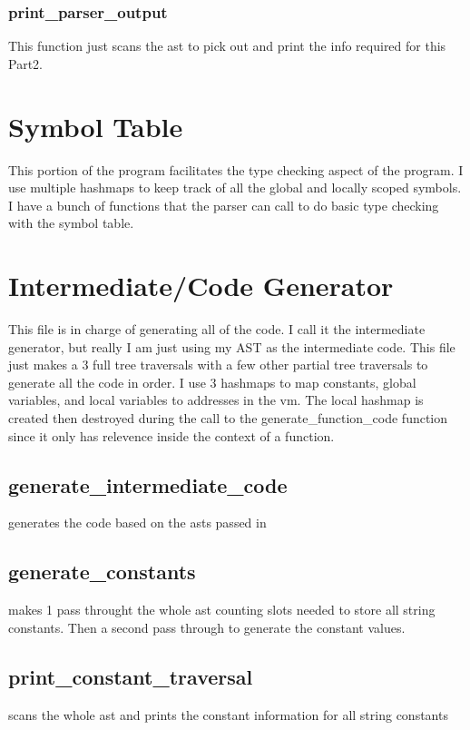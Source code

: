 \documentclass[11pt]{article}
\begin{document}
            \subsubsection{print\_parser\_output}
                This function just scans the ast to pick out and print the info required for this Part2.

    \section{Symbol Table}

        This portion of the program facilitates the type checking aspect of the program.
        I use multiple hashmaps to keep track of all the global and locally scoped symbols.
        I have a bunch of functions that the parser can call to do basic type checking with the
        symbol table.

    \section{Intermediate/Code Generator}
        This file is in charge of generating all of the code. I call it the intermediate generator,
        but really I am just using my AST as the intermediate code. This file just makes a 3 full
        tree traversals with a few other partial tree traversals to generate all the code in order.
        I use 3 hashmaps to map constants, global variables, and local variables to addresses in 
        the vm. The local hashmap is created then destroyed during the call to the 
        generate\_function\_code function since it only has relevence inside the context of a function.

        \subsection{generate\_intermediate\_code}
            generates the code based on the asts passed in

        \subsection{generate\_constants}
            makes 1 pass throught the whole ast counting slots
            needed to store all string constants. Then a second
            pass through to generate the constant values.

        \subsection{print\_constant\_traversal}
            scans the whole ast and prints the constant information 
            for all string constants
\end{document}
